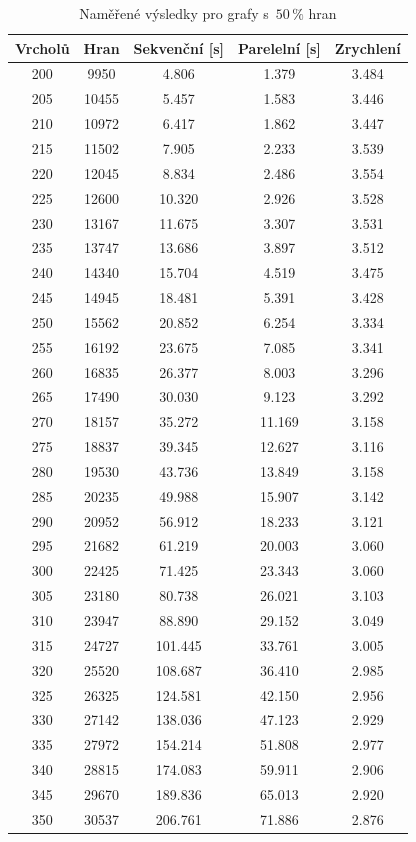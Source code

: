 \documentclass[12pt]{article}
\begin{document}
\begin{table}[H]
\begin{center}
\begin{tabular}{ c c c c c }
\toprule
Vrcholů & Hran & Sekvenční [s] & Parelelní [s] & Zrychlení\\\midrule
200 & 9950 & 4.806 & 1.379 & 3.484\\
205 & 10455 & 5.457 & 1.583 & 3.446\\
210 & 10972 & 6.417 & 1.862 & 3.447\\
215 & 11502 & 7.905 & 2.233 & 3.539\\
220 & 12045 & 8.834 & 2.486 & 3.554\\
225 & 12600 & 10.320 & 2.926 & 3.528\\
230 & 13167 & 11.675 & 3.307 & 3.531\\
235 & 13747 & 13.686 & 3.897 & 3.512\\
240 & 14340 & 15.704 & 4.519 & 3.475\\
245 & 14945 & 18.481 & 5.391 & 3.428\\
250 & 15562 & 20.852 & 6.254 & 3.334\\
255 & 16192 & 23.675 & 7.085 & 3.341\\
260 & 16835 & 26.377 & 8.003 & 3.296\\
265 & 17490 & 30.030 & 9.123 & 3.292\\
270 & 18157 & 35.272 & 11.169 & 3.158\\
275 & 18837 & 39.345 & 12.627 & 3.116\\
280 & 19530 & 43.736 & 13.849 & 3.158\\
285 & 20235 & 49.988 & 15.907 & 3.142\\
290 & 20952 & 56.912 & 18.233 & 3.121\\
295 & 21682 & 61.219 & 20.003 & 3.060\\
300 & 22425 & 71.425 & 23.343 & 3.060\\
305 & 23180 & 80.738 & 26.021 & 3.103\\
310 & 23947 & 88.890 & 29.152 & 3.049\\
315 & 24727 & 101.445 & 33.761 & 3.005\\
320 & 25520 & 108.687 & 36.410 & 2.985\\
325 & 26325 & 124.581 & 42.150 & 2.956\\
330 & 27142 & 138.036 & 47.123 & 2.929\\
335 & 27972 & 154.214 & 51.808 & 2.977\\
340 & 28815 & 174.083 & 59.911 & 2.906\\
345 & 29670 & 189.836 & 65.013 & 2.920\\
350 & 30537 & 206.761 & 71.886 & 2.876\\
\bottomrule
\end{tabular}
\end{center}
\caption{Naměřené výsledky pro grafy s~$50\,\%$ hran} 
\end{table}
\end{document}
